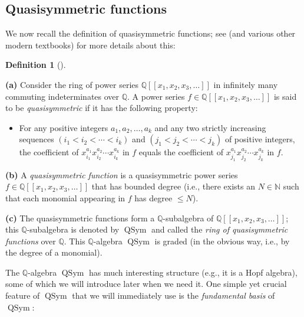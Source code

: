 \documentclass[numbers=enddot,12pt,final,onecolumn,notitlepage]{scrartcl}%
\theoremstyle{definition}
\newtheorem{defi}[theo]{Definition}
\newenvironment{definition}[1][]
{\begin{defi}[#1]\begin{leftbar}}
{\end{leftbar}\end{defi}}
\begin{document}
\subsection{Quasisymmetric functions}

We now recall the definition of quasisymmetric functions; see \cite[Chapter
5]{HopfComb} (and various other modern textbooks) for more details about this:

\begin{definition}
\textbf{(a)}
Consider the ring of power series $\mathbb{Q}\left[  \left[  x_{1},x_{2}%
,x_{3},\ldots\right]  \right]  $ in infinitely many commuting indeterminates
over $\mathbb{Q}$.
A power series $f\in\mathbb{Q}\left[  \left[  x_{1}%
,x_{2},x_{3},\ldots\right]  \right]  $ is said to be \textit{quasisymmetric}
if it has the following property:
\begin{itemize}
\item For any positive integers $a_{1}%
,a_{2},\ldots,a_{k}$ and any two strictly increasing sequences $\left(
i_{1}<i_{2}<\cdots<i_{k}\right)  $ and $\left(  j_{1}<j_{2}<\cdots
<j_{k}\right)  $ of positive integers, the coefficient of $x_{i_{1}}^{a_{1}%
}x_{i_{2}}^{a_{2}}\cdots x_{i_{k}}^{a_{k}}$ in $f$ equals the coefficient of
$x_{j_{1}}^{a_{1}}x_{j_{2}}^{a_{2}}\cdots x_{j_{k}}^{a_{k}}$ in $f$.
\end{itemize}

\textbf{(b)}
A \textit{quasisymmetric function} is a quasisymmetric power series
$f\in\mathbb{Q}\left[  \left[  x_{1},x_{2},x_{3},\ldots\right]  \right]  $
that has bounded degree (i.e., there exists an $N\in\mathbb{N}$ such that each
monomial appearing in $f$ has degree $\leq N$).

\textbf{(c)} The quasisymmetric functions
form a $\mathbb{Q}$-subalgebra of $\mathbb{Q}\left[  \left[  x_{1},x_{2}%
,x_{3},\ldots\right]  \right]  $; this $\mathbb{Q}$-subalgebra is denoted by
$\operatorname*{QSym}$ and called the \textit{ring of quasisymmetric
functions} over $\mathbb{Q}$.
This $\mathbb{Q}$-algebra $\operatorname{QSym}$ is graded (in the obvious way,
i.e., by the degree of a monomial).
\end{definition}

The $\mathbb{Q}$-algebra $\operatorname*{QSym}$ has much interesting structure
(e.g., it is a Hopf algebra), some of which we will introduce later when we
need it. One simple yet crucial feature of $\operatorname*{QSym}$ that we will
immediately use is the \textit{fundamental basis} of $\operatorname*{QSym}$:
\end{document}
